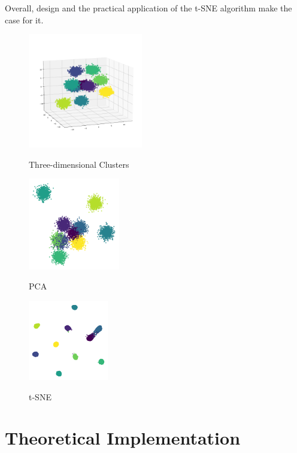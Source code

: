 Overall, design and the practical application of the \ac{t-SNE} algorithm make the case for it.

\begin{figure} 
	\begin{minipage}{0.3\textwidth}
		\label{fig:origina}
		\includegraphics[height=5cm]{Bilder/models/original.pdf}
		\caption{Three-dimensional Clusters}
	\end{minipage}
	\hfill
	\begin{minipage}{0.3\textwidth}
		\label{fig:pca}
		\includegraphics[height=4cm]{Bilder/models/pca.pdf}
		\caption{\ac{PCA}}
	\end{minipage}
	\hfill
	\begin{minipage}{0.3\textwidth}
		\label{fig:tsne}
		\includegraphics[height=3.5cm]{Bilder/models/tsne.pdf}
		\caption{\ac{t-SNE}}
	\end{minipage}
\end{figure} 

\section{Theoretical Implementation}

